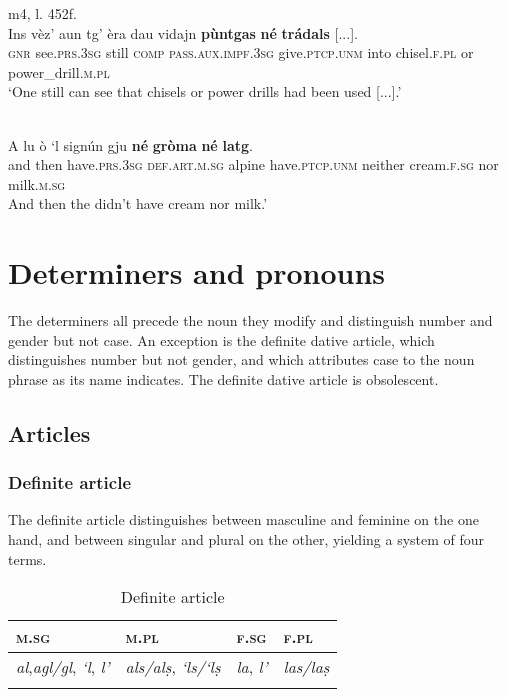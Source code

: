 \ea
\label{}
 {m4, l. 452f.}\\
\gll Ins vèz’ aun tg’ èra dau vidajn \textbf{pùntgas} \textbf{né} \textbf{trádals} [...].\\
\textsc{gnr} see.\textsc{prs.3sg} still \textsc{comp} \textsc{pass.aux.impf.3sg} give.\textsc{ptcp.unm} into chisel.\textsc{f.pl} or power\_drill.\textsc{m.pl}\\
\glt `One still can see that chisels or power drills had been used [...].'
\z

\ea
\label{}
\\
\gll A lu ò `l signún gju \textbf{né} \textbf{gròma} \textbf{né} \textbf{latg}.\\
and then have.\textsc{prs.3sg} \textsc{def.art.m.sg} alpine have.\textsc{ptcp.unm} neither cream.\textsc{f.sg} nor milk.\textsc{m.sg}\\
\glt And then the didn't have cream nor milk.'
\z


\section{Determiners and pronouns}
The determiners all precede the noun they modify and distinguish number and gender but not case. An exception is the definite dative article, which distinguishes number but not gender, and which attributes case to the noun phrase as its name indicates. The definite dative article is obsolescent.

\subsection{Articles}

\subsubsection{Definite article}
The definite article distinguishes between masculine and feminine on the one hand, and between singular and plural on the other, yielding a system of four terms.

\begin{table}
\caption{Definite article}
\label{tab:1:defart}
 \begin{tabular}{llll}
  \lsptoprule
   \textsc{m.sg}   &  \textsc{m.pl} & \textsc{f.sg} & \textsc{f.pl}\\ 
  \midrule
  \textit{al},\textit{agl/gl}, \textit{`l}, \textit{l'} & \textit{als/alṣ}, \textit{`ls/`lṣ} & \textit{la}, \textit{l'} &  \textit{las/laṣ}\\
\lspbottomrule
\end{tabular}
\end{table}

